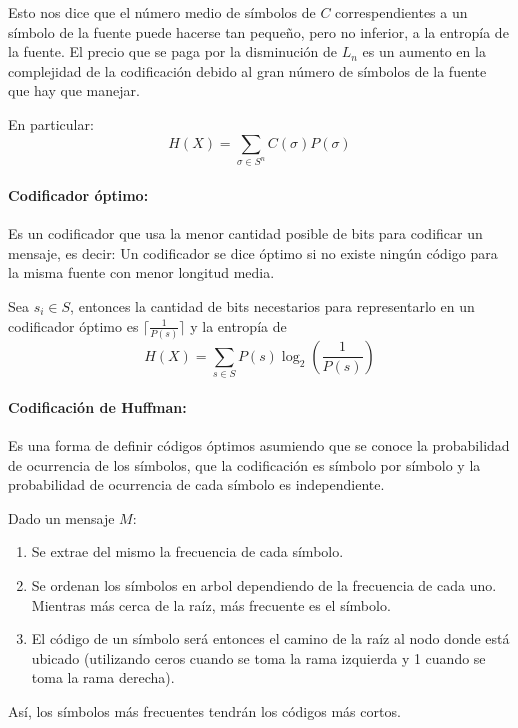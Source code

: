 Esto nos dice que el número medio de símbolos de \(C\) correspendientes a un símbolo de la fuente puede hacerse tan pequeño, pero no inferior, a la entropía de la fuente. El precio que se paga por la disminución de \(L_n\) es un aumento en la complejidad de la codificación debido al gran número de símbolos de la fuente que hay que manejar.

En particular:
\[
  H(X) = \sum_{\sigma\in S^n} C(\sigma)P(\sigma)  
\]

\paragraph{Codificador óptimo:} Es un codificador que usa la menor cantidad posible de bits para codificar un mensaje, es decir: Un codificador se dice óptimo si no existe ningún código para la misma fuente con menor longitud media.

Sea \(s_i\in S\), entonces la cantidad de bits necestarios para representarlo en un codificador óptimo es \(\lceil\frac{1}{P(s)}\rceil\) y la entropía de \[H(X) = \sum_{s\in S} P(s)\log_2\left(\frac{1}{P(s)}\right)\]

\paragraph{Codificación de Huffman:} Es una forma de definir códigos óptimos asumiendo que se conoce la probabilidad de ocurrencia de los símbolos, que la codificación es símbolo por símbolo y la probabilidad de ocurrencia de cada símbolo es independiente.

Dado un mensaje \(M\):
\begin{enumerate}
  \item Se extrae del mismo la frecuencia de cada símbolo.
  \item Se ordenan los símbolos en arbol dependiendo de la frecuencia de cada uno. Mientras más cerca de la raíz, más frecuente es el símbolo.
  \item El código de un símbolo será entonces el camino de la raíz al nodo donde está ubicado (utilizando
  ceros cuando se toma la rama izquierda y 1 cuando se toma la rama derecha).
\end{enumerate} 

Así, los símbolos más frecuentes tendrán los códigos más cortos.




